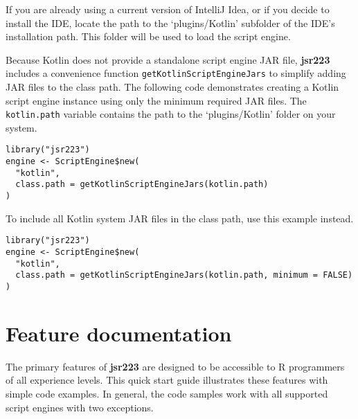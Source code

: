 \documentclass[
article,
11pt, %
a4paper, %
oneside, %
headinclude,footinclude, %
]{scrartcl}
\theoremstyle{definition} %
\theoremstyle{plain} %
\theoremstyle{remark} %
\newcommand{\pkg}[1]{\textbf{#1}}
\newcommand{\code}[1]{\texttt{#1}}
\newcommand{\file}[1]{{`\normalfont\textsf{#1}'}}
\newcommand{\samp}[1]{{`\normalfont\texttt{#1}'}}
\begin{document}
If you are already using a current version of IntelliJ Idea, or if you decide to install the IDE, locate the path to the \file{plugins/Kotlin} subfolder of the IDE's installation path. This folder will be used to load the script engine.

Because Kotlin does not provide a standalone script engine JAR file, \pkg{jsr223} includes a convenience function \code{getKotlinScriptEngineJars} to simplify adding JAR files to the class path. The following code demonstrates creating a Kotlin script engine instance using only the minimum required JAR files. The \code{kotlin.path} variable contains the path to the \file{plugins/Kotlin} folder on your system.

\begin{verbatim}
library("jsr223")
engine <- ScriptEngine$new(
  "kotlin",
  class.path = getKotlinScriptEngineJars(kotlin.path)
)
\end{verbatim}
To include all Kotlin system JAR files in the class path, use this example instead.

\begin{verbatim}
library("jsr223")
engine <- ScriptEngine$new(
  "kotlin",
  class.path = getKotlinScriptEngineJars(kotlin.path, minimum = FALSE)
)
\end{verbatim}


\hypertarget{feature-documentation}{}
\section{Feature documentation}

The primary features of \pkg{jsr223} are designed to be accessible to R programmers of all experience levels. This quick start guide illustrates these features with simple code examples. In general, the code samples work with all supported script engines with two exceptions.
\end{document}
